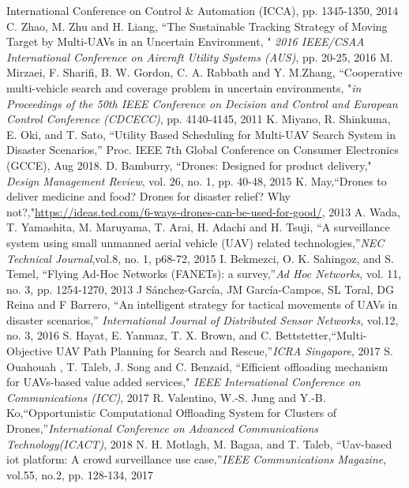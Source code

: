 \documentclass{ieeeaccess}
\begin{document}
\begin{thebibliography}{1}
{International Conference on Control \& Automation (ICCA)}, pp. 1345-1350, 2014 
 C. Zhao, M. Zhu and H. Liang, ``The Sustainable Tracking Strategy of Moving Target by Multi-UAVs in an Uncertain Environment, " \emph{2016 IEEE/CSAA International Conference on Aircraft Utility Systems (AUS)}, pp. 20-25, 2016
 M. Mirzaei, F. Sharifi, B. W. Gordon, C. A. Rabbath and  Y. M.Zhang, ``Cooperative multi-vehicle search and coverage problem in uncertain environments, "\emph{in Proceedings of the 50th IEEE Conference on Decision and Control and European Control Conference (CDCECC)}, pp. 4140-4145, 2011
%
  K. Miyano, R. Shinkuma, E. Oki, and T. Sato, ``Utility Based Scheduling for Multi-UAV Search System in Disaster Scenarios,'' Proc. IEEE 7th Global Conference on Consumer Electronics (GCCE), Aug 2018.
 D. Bamburry, ``Drones: Designed for product delivery," \emph{Design Management Review}, vol. 26, no. 1, pp. 40-48, 2015
K. May,``Drones to deliver medicine and food? Drones for disaster relief? Why not?,"\url{https://ideas.ted.com/6-ways-drones-can-be-used-for-good/}, 2013
A. Wada, T. Yamashita, M. Maruyama, T. Arai, H. Adachi and H. Tsuji, ``A surveillance system using small unmanned aerial vehicle (UAV) related technologies,''\emph{NEC Technical Journal},vol.8, no. 1, p68-72, 2015
 I. Bekmezci, O. K. Sahingoz, and S. Temel, ``Flying Ad-Hoc Networks (FANETs): a survey,''\emph{Ad Hoc Networks}, vol. 11, no. 3, pp. 1254-1270, 2013
 J S\'anchez-Garc\'ia, JM Garc\'ia-Campos, SL Toral, DG Reina and F Barrero, ``An intelligent strategy for tactical movements of UAVs in disaster scenarios,''\emph{
International Journal of Distributed Sensor Networks}, vol.12, no. 3, 2016
S. Hayat, E. Yanmaz, T. X. Brown, and C. Bettstetter,``Multi-Objective UAV Path Planning for Search and Rescue,''\emph{ICRA Singapore}, 2017 
%
S. Ouahouah , T. Taleb, J. Song and C. Benzaid, ``Efficient offloading mechanism for UAVs-based value added services," \emph{IEEE International Conference on Communications (ICC)}, 2017
 R. Valentino, W.-S. Jung and Y.-B. Ko,``Opportunistic Computational Offloading System for Clusters of Drones,''\emph{International Conference on Advanced Communications Technology(ICACT)}, 2018 
%
N. H. Motlagh, M. Bagaa, and T. Taleb, ``Uav-based iot platform: A crowd surveillance use case,''\emph{IEEE Communications Magazine}, vol.55, no.2, pp. 128-134, 2017

\end{thebibliography}
\end{document}
